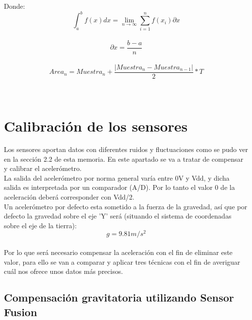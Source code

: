 Donde:
\[\int_{a}^{b}f(x) dx=\lim_{n\rightarrow \infty }\sum_{i=1}^{n}f(x_{i})\partial x\]
\\
\[\partial x = \frac{b-a}{n}\]
\\
\[Area_{n} = Muestra_{n} +\frac{\left | Muestra_{n}-Muestra_{n-1} \right |}{2} * T\]
\\
\\
\section{Calibración de los sensores}

Los sensores aportan datos con diferentes ruidos y fluctuaciones como se pudo ver en la sección 2.2 de esta memoria. En este apartado se va a tratar de compensar y calibrar el acelerómetro.
\\
La salida del acelerómetro por norma general varía entre 0V y Vdd, y dicha salida es interpretada por un comparador (A/D). Por lo tanto el valor 0 de la aceleración deberá corresponder con Vdd/2.
\\
Un acelerómetro por defecto esta sometido a la fuerza de la gravedad, así que por defecto la gravedad sobre el eje 'Y' será (situando el sistema de coordenadas sobre el eje de la tierra):
\\
\[g = 9.81 m/s^{2}\]
\\
Por lo que será necesario compensar la aceleración con el fin de eliminar este valor, para ello se van a comparar y aplicar tres técnicas con el fin de averiguar cuál nos ofrece unos datos más precisos.

\subsection{Compensación gravitatoria utilizando Sensor Fusion}

